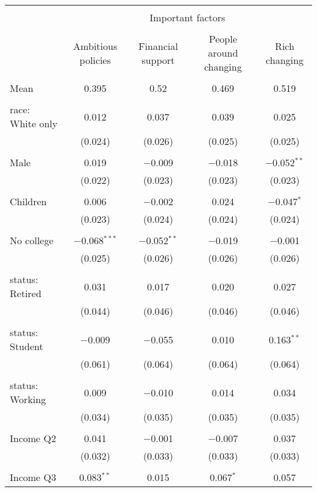 
\begin{tabular}{@{\extracolsep{5pt}}lcccc} 
\\[-1.8ex]\hline 
\hline \\[-1.8ex] 
 & \multicolumn{4}{c}{Important factors} \\ 
\cline{2-5} 
\\[-1.8ex] & Ambitious policies & Financial support & People around changing & Rich changing \\ 
\hline \\[-1.8ex] 
 Mean & 0.395 & 0.52 & 0.469 & 0.519  \\ \hline \\[-1.8ex] race: White only & 0.012 & 0.037 & 0.039 & 0.025 \\ 
  & (0.024) & (0.026) & (0.025) & (0.025) \\ 
  & & & & \\ 
 Male & 0.019 & $-$0.009 & $-$0.018 & $-$0.052$^{**}$ \\ 
  & (0.022) & (0.023) & (0.023) & (0.023) \\ 
  & & & & \\ 
 Children & 0.006 & $-$0.002 & 0.024 & $-$0.047$^{*}$ \\ 
  & (0.023) & (0.024) & (0.024) & (0.024) \\ 
  & & & & \\ 
 No college & $-$0.068$^{***}$ & $-$0.052$^{**}$ & $-$0.019 & $-$0.001 \\ 
  & (0.025) & (0.026) & (0.026) & (0.026) \\ 
  & & & & \\ 
 status: Retired & 0.031 & 0.017 & 0.020 & 0.027 \\ 
  & (0.044) & (0.046) & (0.046) & (0.046) \\ 
  & & & & \\ 
 status: Student & $-$0.009 & $-$0.055 & 0.010 & 0.163$^{**}$ \\ 
  & (0.061) & (0.064) & (0.064) & (0.064) \\ 
  & & & & \\ 
 status: Working & 0.009 & $-$0.010 & 0.014 & 0.034 \\ 
  & (0.034) & (0.035) & (0.035) & (0.035) \\ 
  & & & & \\ 
 Income Q2 & 0.041 & $-$0.001 & $-$0.007 & 0.037 \\ 
  & (0.032) & (0.033) & (0.033) & (0.033) \\ 
  & & & & \\ 
 Income Q3 & 0.083$^{**}$ & 0.015 & 0.067$^{*}$ & 0.057 \\ 

\end{tabular}
